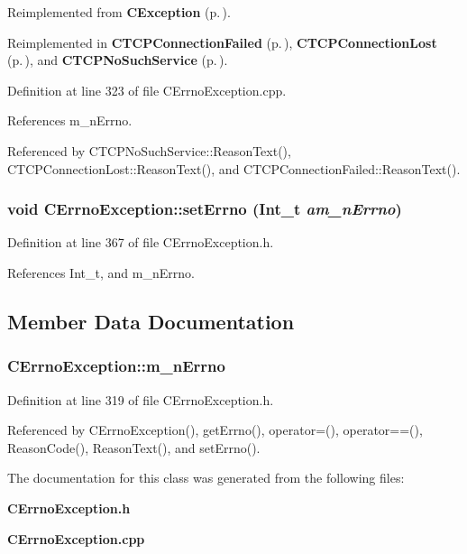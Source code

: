 Reimplemented from {\bf CException} {\rm (p.\,\pageref{classCException_a8})}.

Reimplemented in {\bf CTCPConnection\-Failed} {\rm (p.\,\pageref{classCTCPConnectionFailed_a7})}, {\bf CTCPConnection\-Lost} {\rm (p.\,\pageref{classCTCPConnectionLost_a7})}, and {\bf CTCPNo\-Such\-Service} {\rm (p.\,\pageref{classCTCPNoSuchService_a6})}.

Definition at line 323 of file CErrno\-Exception.cpp.

References m\_\-n\-Errno.

Referenced by CTCPNo\-Such\-Service::Reason\-Text(), CTCPConnection\-Lost::Reason\-Text(), and CTCPConnection\-Failed::Reason\-Text().
\subsubsection{\setlength{\rightskip}{0pt plus 5cm}void CErrno\-Exception::set\-Errno ({\bf Int\_\-t} {\em am\_\-n\-Errno})\hspace{0.3cm}{\tt  [inline, protected]}}\label{classCErrnoException_b0}




Definition at line 367 of file CErrno\-Exception.h.

References Int\_\-t, and m\_\-n\-Errno.

\subsection{Member Data Documentation}
\subsubsection{ CErrno\-Exception::m\_\-n\-Errno\hspace{0.3cm}{\tt  [private]}}\label{classCErrnoException_o0}




Definition at line 319 of file CErrno\-Exception.h.

Referenced by CErrno\-Exception(), get\-Errno(), operator=(), operator==(), Reason\-Code(), Reason\-Text(), and set\-Errno().

The documentation for this class was generated from the following files:\begin{CompactItemize}
\item 
{\bf CErrno\-Exception.h}\item 
{\bf CErrno\-Exception.cpp}\end{CompactItemize}
